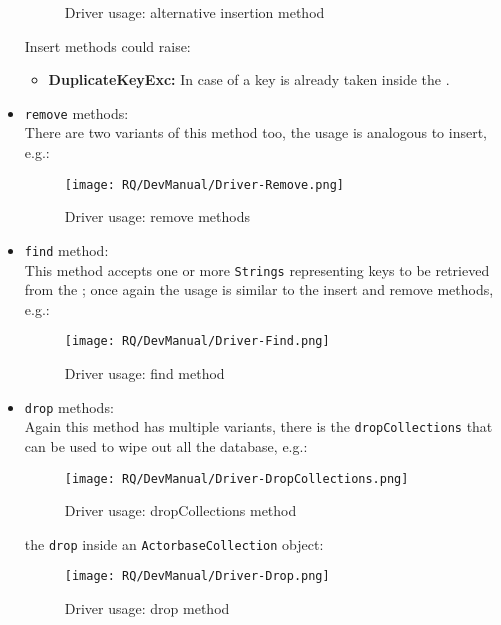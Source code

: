 \documentclass{scalatekids-article}
\begin{document}
\begin{itemize}
\begin{figure}[H]
\begin{center}
      \caption{Driver usage: alternative insertion method}
    \end{center}
  \end{figure}
  Insert methods could raise:
  \begin{itemize}
  \item \textbf{DuplicateKeyExc:} In case of a key is already taken inside the .
  \end{itemize}
\item \verb=remove= methods:\\ There are two variants of this method too, the usage is
  analogous to insert, e.g.:
  \begin{figure}[H]
    \begin{center}
      \texttt{[image: RQ/DevManual/Driver-Remove.png]}
      \caption{Driver usage: remove methods}
    \end{center}
  \end{figure}
\item \verb=find= method:\\ This method accepts one or more \verb=Strings= representing
  keys to be retrieved from the ; once again the usage is similar to the insert and
  remove methods, e.g.:
  \begin{figure}[H]
    \begin{center}
      \texttt{[image: RQ/DevManual/Driver-Find.png]}
      \caption{Driver usage: find method}
    \end{center}
  \end{figure}
\item \verb=drop= methods:\\ Again this method has multiple variants, there is the
  \verb=dropCollections= that can be used to wipe out all the database, e.g.:
  \begin{figure}[H]
    \begin{center}
      \texttt{[image: RQ/DevManual/Driver-DropCollections.png]}
      \caption{Driver usage: dropCollections method}
    \end{center}
  \end{figure}
  the \verb=drop= inside an \verb=ActorbaseCollection= object:
  \begin{figure}[H]
    \begin{center}
      \texttt{[image: RQ/DevManual/Driver-Drop.png]}
      \caption{Driver usage: drop method}

\end{center}
\end{figure}
\end{itemize}
\end{document}
